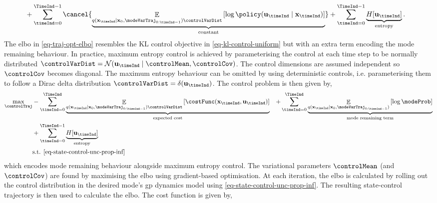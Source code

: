 \documentclass{mimosis-class/mimosis}
\numberwithin{equation}{chapter}
\DeclareMathOperator{\E}{\mathbb{E}}
\newcommand{\state}{\ensuremath{\mathbf{x}}}
\newcommand{\control}{\ensuremath{\mathbf{u}}}
\begin{document}
{\begin{align}
&+ \sum_{\timeInd=0}^{\TimeInd-1} \cancel{\underbrace{\E_{q(\state_{\timeInd} \mid \state_0, \modeVarTraj_{0:\timeInd-1}) \controlVarDist }
\left[\log\policy(\control_{\timeInd} \mid \state_\timeInd)\right]}_{\text{constant}}}
+ \sum_{\timeInd=0}^{\TimeInd-1} \underbrace{H[\control_{\timeInd}]}_{\text{entropy}}.
\end{align}
The \acrshort{elbo} in \cref{eq-traj-opt-elbo} resembles the KL control objective in \cref{eq-kl-control-uniform}
but with an extra term encoding the mode remaining behaviour.
In practice, maximum entropy control is achieved by parameterising the control at each time step to
be normally distributed \({\controlVarDist = \mathcal{N}(\control_{\timeInd} \mid \controlMean, \controlCov)}\).
The control dimensions are assumed independent so \(\controlCov\) becomes diagonal.
The maximum entropy behaviour can be omitted by using deterministic controls, i.e.
parameterising them to follow a Dirac delta distribution \(\controlVarDist = \delta(\control_\timeInd)\).
The control problem is then given by,
\begin{subequations} \label{eq-traj-opt-inference}
\begin{align}
\max_{\controlTraj} &-\sum_{\timeInd=0}^{\TimeInd}
\underbrace{\E_{q(\state_{\timeInd} \mid \state_0, \modeVarTraj_{0:\timeInd-1}) \controlVarDist} \left[ \costFunc(\state_\timeInd, \control_\timeInd) \right]}_{\text{expected cost}}
&+ \sum_{\timeInd=0}^{\TimeInd} \underbrace{\E_{q(\state_{\timeInd} \mid \state_0, \modeVarTraj_{0:\timeInd-1})} \left[
\log \modeProb \right]}_{\text{mode remaining term}} \nonumber \\
 &+ \sum_{\timeInd=0}^{\TimeInd-1} \underbrace{H[\control_{\timeInd}]}_{\text{entropy}} \\
&\text{s.t. \cref{eq-state-control-unc-prop-inf}}
\end{align}
\end{subequations}
which encodes mode remaining behaviour alongside maximum entropy control.
The variational parameters \(\controlMean\) (and \(\controlCov\))
are found by maximising the \acrshort{elbo} using gradient-based optimisation.
At each iteration, the \acrshort{elbo} is calculated by rolling out the control distribution in the
desired mode's \acrshort{gp} dynamics model using \cref{eq-state-control-unc-prop-inf}.
The resulting state-control trajectory is then used to calculate the \acrshort{elbo}.
The cost function is given by,
\begin{align} \label{eq-quadratic-cost-control}

\end{align}}
\end{document}

